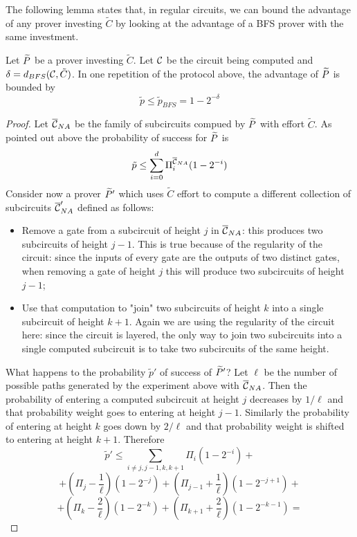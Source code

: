 The following lemma states that, in regular circuits, we can bound the advantage of any prover investing $\tilde{C}$ by looking at the advantage of a BFS prover with the same investment.

\begin{lemma}
	\label{lemma:bfs-bound-reg}
	Let $\widetilde{P}$ be a prover investing $\tilde{C}$. Let $\cal C$ be the circuit being computed and $\delta=d_{BFS}({\cal C},\tilde{C})$. In one repetition of the  		protocol above, the advantage of $\widetilde{P}$ is bounded by 
	$$ \tilde{p} \leq \tilde{p}_{BFS} = 1 - 2^{-\delta}$$ 
\end{lemma}

 \begin{proof}
Let $\overline{\cal{C}}_{NA}$ be the family of subcircuits compued by $\widetilde{P}$ with effort $\tilde{C}$. As pointed out above the probability of success for $\widetilde{P}$ is 
$$ \tilde{p} \leq \sum_{i=0}^{d} \Pi_i^{\overline{\cal{C}}_{NA}} (1 - 2^{-i})$$
Consider now a prover $\widetilde{P}'$ which uses $\tilde{C}$ effort to compute a different collection of subcircuits $\overline{\cal{C}}_{NA}'$ defined as follows: 
\begin{itemize}
\item Remove a gate from a subcircuit of height $j$ in $\overline{\cal{C}}_{NA}$: this produces two subcircuits of height $j-1$. This is true because of the regularity of the circuit: since the inputs of every gate are the outputs of two distinct gates, when removing a gate of height $j$ this will produce two subcircuits of height $j-1$;
\item Use that computation to "join" two subcircuits of height $k$ into a single subcircuit of height $k+1$. Again we are using the regularity of the circuit here: since the circuit is layered, the only way to join two subcircuits into a single computed subcircuit is to take two subcircuits of the same height. 
\end{itemize}
What happens to the probability $\tilde{p}'$ of success of $\widetilde{P}'$? Let $\ell$ be the number of possible paths generated by the experiment above
with $\overline{\cal{C}}_{NA}$. Then the probability of entering a computed subcircuit at height $j$ decreases by $1/\ell$ and that probability weight goes to entering at
height $j-1$. Similarly the probability of entering at height $k$ goes down by $2/\ell$ and that probability weight is shifted to entering at height $k+1$. 
Therefore 
$$ \tilde{p}' \leq \sum_{i \neq j,j-1,k,k+1} \Pi_i (1 - 2^{-i}) + $$
$$ + (\Pi_j - \frac{1}{\ell})(1-2^{-j}) + (\Pi_{j-1} + \frac{1}{\ell})(1-2^{-j+1}) + $$
$$ + (\Pi_k - \frac{2}{\ell})(1-2^{-k}) + (\Pi_{k+1} + \frac{2}{\ell})(1-2^{-k-1}) = $$

\end{proof}
